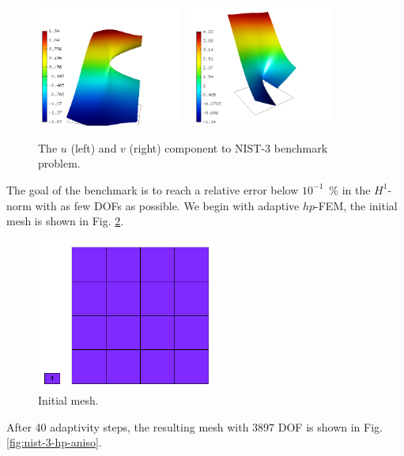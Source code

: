 \begin{figure}[!ht]
\centering
\includegraphics[height=40mm]{nist/nist-3/solution-u.png}\ \
\includegraphics[height=40mm]{nist/nist-3/solution-v.png}
\caption{The $u$ (left) and $v$ (right) component to NIST-3 benchmark problem.}
\label{fig:sln-nist03}
\end{figure}

The goal of the benchmark is to reach a relative error below
$10^{-1}$~\% in the $H^1$-norm with as few DOFs as possible.
We begin with adaptive $hp$-FEM,
the initial mesh is shown in Fig. \ref{fig:nist-3-hp-aniso-init}.

\begin{figure}[!ht]
\centering
\includegraphics[height=5cm]{nist/nist-3/mesh_hp_aniso_init.png}
\caption{Initial mesh.}
\label{fig:nist-3-hp-aniso-init}
\end{figure}

After 40 adaptivity steps,
the resulting mesh with 3897 DOF is shown in Fig. \ref{fig:nist-3-hp-aniso}.

